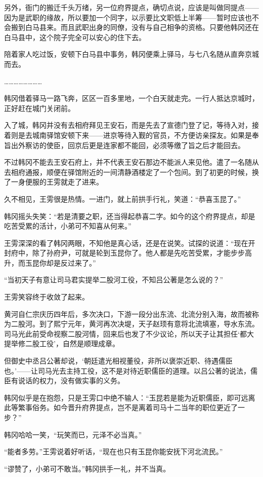 另外，衙门的搬迁千头万绪，另一位府界提点，确切点说，应该是叫做同提点——因为是武职的缘故，所以要加一个同字，以示要比文职低上半筹——暂时应该也不会搬到白马县来。而且武职出身的同僚，没有与自己相争的资格。只要他韩冈还在白马县中，这个院子完全可以安心的住下去。

陪着家人吃过饭，安顿下白马县中事务，韩冈便乘上驿马，与七八名随从直奔京城而去。

……………………

韩冈借着驿马一路飞奔，区区一百多里地，一个白天就走完。一行人抵达京城时，正好赶在城门关闭前。

入了城，韩冈并没有去相府拜见王安石，而是先去了宣德门登了记，等待入对，接着则是去城南驿馆安顿下来——进京等待入觐的官员，不方便访亲探友。如果是奉旨出外察访的使臣，回京后更是连家都不能回，必须等缴了旨之后才能回去。

不过韩冈不能去王安石府上，并不代表王安石那边不能派人来见他。遣了一名随从去相府通报，顺便在驿馆附近的一间清静酒楼定了一个包间。到了初更的时候，换了一身便服的王雱就走了进来。

久不相见，王雱很是热情。一进门，就上前拱手行礼，笑道：“恭喜玉昆了。”

韩冈摇头失笑：“若是清要之职，还当得起恭喜二字。如今的这个府界提点，却是吃苦受累的活计，小弟可不知喜从何来。”

王雱深深的看了韩冈两眼，不知他是真心话，还是在说笑。试探的说道：“现在开封府中，除了孙府尹，可就是轮到玉昆你了。他人都是先吃苦受累，才能步步高升，而玉昆你却是反过来了。”

“当初天子有意让司马君实提举二股河工役，不知吕公著是怎么说的？”

王雱笑容终于收敛了起来。

黄河自仁宗庆历四年后，多次决口，下游一段分出东流、北流分别入海，故而被称为二股河。到了熙宁元年，黄河再次决堤，天子赵顼有意将北流填塞，导水东流。司马光此前受命视察二股河情，回来后也发了不少议论，所以天子让其担任‘都大提举修二股工役’，自然是顺理成章。

但御史中丞吕公著却说，‘朝廷遣光相视董役，非所以褒崇近职、待遇儒臣也。’——让司马光去主持工役，这不是对待近职儒臣的道理。以吕公著的说法，儒臣有说话的权力，没有做实事的义务。

韩冈似乎是在抱怨，只是王雱口中绝不输人：“玉昆若是能为近职儒臣，即可远离此等繁事俗务。如今晋升府界提点，岂不是离着司马十二当年的职位更近了一步？”

韩冈哈哈一笑，“玩笑而已，元泽不必当真。”

“能者多劳。”王雱说着好听话，“现在也只有玉昆你能安抚下河北流民。”

“谬赞了，小弟可不敢当。”韩冈拱手一礼，并不当真。

